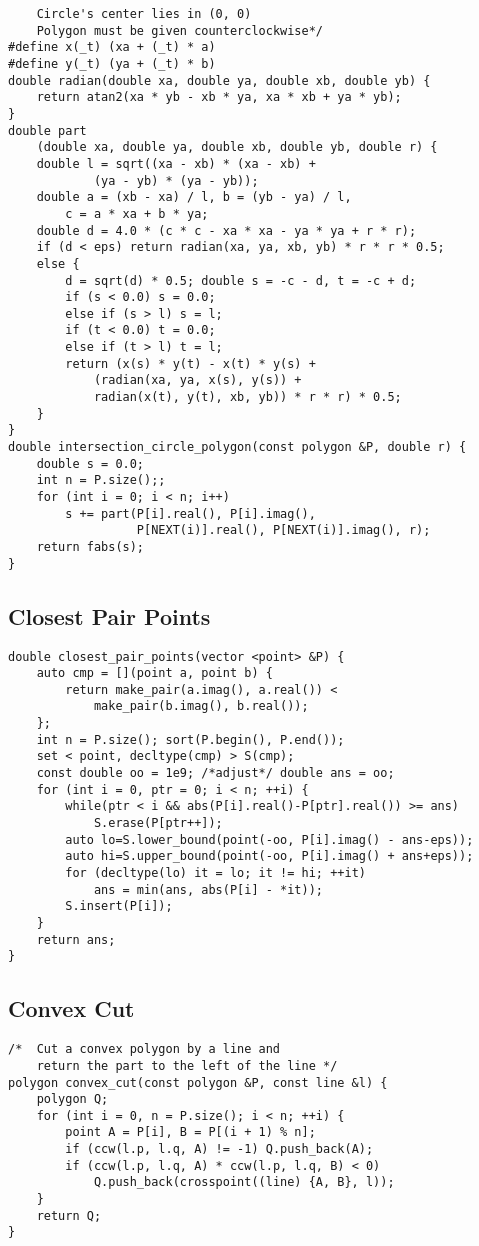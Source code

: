 \documentclass[landscape, 8pt, a4paper, oneside]{extarticle}
\begin{document}
\begin{multicols}{3}
\begin{verbatim}
	Circle's center lies in (0, 0)
	Polygon must be given counterclockwise*/
#define x(_t) (xa + (_t) * a)
#define y(_t) (ya + (_t) * b)
double radian(double xa, double ya, double xb, double yb) {
    return atan2(xa * yb - xb * ya, xa * xb + ya * yb);
}
double part
    (double xa, double ya, double xb, double yb, double r) {
    double l = sqrt((xa - xb) * (xa - xb) +
            (ya - yb) * (ya - yb));
    double a = (xb - xa) / l, b = (yb - ya) / l,
        c = a * xa + b * ya;
    double d = 4.0 * (c * c - xa * xa - ya * ya + r * r);
    if (d < eps) return radian(xa, ya, xb, yb) * r * r * 0.5;
    else {
        d = sqrt(d) * 0.5; double s = -c - d, t = -c + d;
        if (s < 0.0) s = 0.0;
        else if (s > l) s = l;
        if (t < 0.0) t = 0.0;
        else if (t > l) t = l;
        return (x(s) * y(t) - x(t) * y(s) +
            (radian(xa, ya, x(s), y(s)) +
            radian(x(t), y(t), xb, yb)) * r * r) * 0.5;
    }
}
double intersection_circle_polygon(const polygon &P, double r) {
    double s = 0.0;
    int n = P.size();;
    for (int i = 0; i < n; i++)
        s += part(P[i].real(), P[i].imag(),
                  P[NEXT(i)].real(), P[NEXT(i)].imag(), r);
    return fabs(s);
}
\end{verbatim}
\subsection{Closest Pair Points}
\begin{verbatim}
double closest_pair_points(vector <point> &P) {
    auto cmp = [](point a, point b) {
        return make_pair(a.imag(), a.real()) <
            make_pair(b.imag(), b.real());
    };
    int n = P.size(); sort(P.begin(), P.end());
    set < point, decltype(cmp) > S(cmp);
    const double oo = 1e9; /*adjust*/ double ans = oo;
    for (int i = 0, ptr = 0; i < n; ++i) {
        while(ptr < i && abs(P[i].real()-P[ptr].real()) >= ans)
            S.erase(P[ptr++]);
        auto lo=S.lower_bound(point(-oo, P[i].imag() - ans-eps));
        auto hi=S.upper_bound(point(-oo, P[i].imag() + ans+eps));
        for (decltype(lo) it = lo; it != hi; ++it)
            ans = min(ans, abs(P[i] - *it));
        S.insert(P[i]);
    }
    return ans;
}
\end{verbatim}
\subsection{Convex Cut}
\begin{verbatim}
/*  Cut a convex polygon by a line and
	return the part to the left of the line */
polygon convex_cut(const polygon &P, const line &l) {
    polygon Q;
    for (int i = 0, n = P.size(); i < n; ++i) {
        point A = P[i], B = P[(i + 1) % n];
        if (ccw(l.p, l.q, A) != -1) Q.push_back(A);
        if (ccw(l.p, l.q, A) * ccw(l.p, l.q, B) < 0)
            Q.push_back(crosspoint((line) {A, B}, l));
    }
    return Q;
}
\end{verbatim}

\end{multicols}
\end{document}
